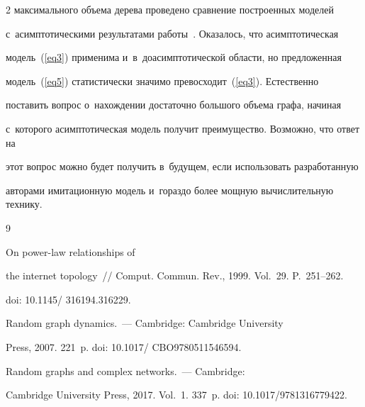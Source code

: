 \begin{multicols}{2}
максимального объема дерева проведено сравнение по\-стро\-ен\-ных моделей 


с~асимп\-то\-ти\-че\-ски\-ми результатами работы~\cite{Pav}. Оказалось, что асимптотическая 


модель~(\ref{eq3}) применима и~в~до\-асимп\-то\-ти\-че\-ской об\-ласти, но предложенная 


модель~(\ref{eq5}) ста\-ти\-сти\-че\-ски значимо превосходит~(\ref{eq3}). Естественно 


поставить вопрос о~на\-хож\-де\-нии достаточно большого объема графа, начиная 


с~которого асимп\-то\-ти\-че\-ская модель получит преимущество. Возможно, что ответ на 


этот вопрос мож\-но будет получить в~будущем, если использовать разработанную 


авторами имитационную модель и~гораздо более мощную вы\-чис\-ли\-тель\-ную технику.








{\small\frenchspacing


 {\baselineskip=11.5pt




 \begin{thebibliography}{9}


 




 On power-law relationships of


the internet topology~// Comput. Commun. Rev., 1999. Vol.~29. P.~251--262.


doi: 10.1145/ 316194.316229.







 Random graph dynamics.~--- Cambridge: Cambridge University


Press, 2007. 221~p. doi: 10.1017/ CBO9780511546594.







 Random graphs and complex networks.~--- Cambridge:


Cambridge University Press, 2017. Vol.~1. 337~p. doi: 10.1017/9781316779422.






\end{thebibliography}}}
\end{multicols}
